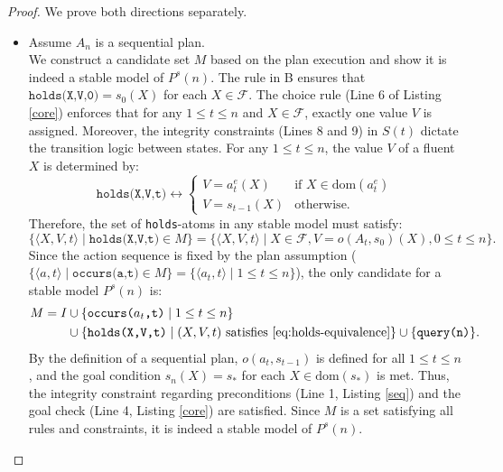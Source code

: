 \documentclass[
     11pt,                    %
     a4paper,             %
     BCOR=10mm,     %
     DIV=14,                 %
     listof=totoc,                    %
     bibliography=totoc,       %
     index=totoc,              %
     parskip            %
     twoside,
     headsepline
     ]{scrreprt}
\theoremstyle{definition}
\theoremstyle{definition}
\theoremstyle{remark}
\theoremstyle{bfnote}
\newcommand{\dom}{\mathrm{dom}}
\begin{document}
\begin{proof}
  We prove both directions separately.
  \begin{itemize}
  \item[($\Rightarrow$):] 
    Assume $A_n$ is a sequential plan. \\
    We construct a candidate set $M$ based on the plan execution and show it is indeed a stable model of $P^s(n)$.
    The rule in B ensures that $\texttt{holds(X,V,0)} = s_0(X)$ for each $X \in \mathcal F$. The choice rule (Line 6 of Listing \ref{core}) enforces that for any $1 \le t \le n$ and $X \in \mathcal F$, exactly one value $V$ is assigned. 
    Moreover, the integrity constraints (Lines 8 and 9) in $S(t)$ dictate the transition logic between states. 
    For any $1 \le t \le n$, the value $V$ of a fluent $X$ is determined by:
    \[
      \texttt{holds(X,V,t)} \leftrightarrow \begin{cases} V = a_t^e(X) & \text{if } X \in \text{dom}(a_t^e) \\ V = s_{t-1}(X) & \text{otherwise.} \end{cases}
    \]
    Therefore, the set of \texttt{holds}-atoms in any stable model must satisfy:
    \begin{equation}
      \{ \langle X, V, t \rangle \mid \texttt{holds(X,V,t)} \in M \}  = \{ \langle X, V, t \rangle \mid X \in \mathcal{F}, V {=} o(A_t, s_0)(X), 0 \le t \le n \}.
      \label{eq:holds-equivalence}
    \end{equation}
    Since the action sequence is fixed by the plan assumption ($\{\langle a, t \rangle \mid \texttt{occurs(a,t)} \in M \} = \{\langle a_t, t \rangle \mid 1 \le t \le n \}$), the only candidate for a stable model $P^s(n)$ is:
    \begin{align*}
      M = I &\cup \{ \texttt{occurs($a_t$,t)} \mid 1 \le t \le n \} \\
            &\cup \{\texttt{holds(X,V,t)} \mid (X, V, t) \text{ satisfies } \eqref{eq:holds-equivalence}\}    \cup \{\texttt{query(n)}\}.
    \end{align*}
     By the definition of a sequential plan, $o(a_t, s_{t-1})$ is defined for all $1 \le t \le n$, and the goal condition $s_n(X) = s_*$ for each $X \in \dom(s_*)$ is met. Thus, the integrity constraint regarding preconditions (Line 1, Listing \ref{seq}) and the goal check (Line 4, Listing \ref{core}) are satisfied. Since $M$ is a set satisfying all rules and constraints, it is indeed a stable model of $P^s(n)$.


\end{itemize}
\end{proof}
\end{document}
